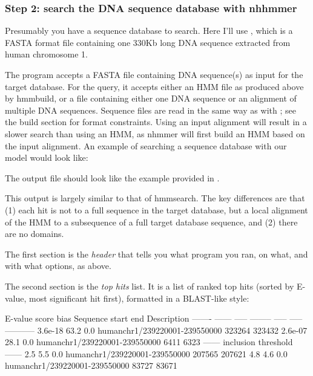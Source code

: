 \subsubsection{Step 2: search the DNA sequence database with nhhmmer}

Presumably you have a sequence database to search. Here I'll use
, which is a FASTA format
file containing one 330Kb long DNA sequence extracted from human chromosome 1.

The program  accepts a FASTA file containing DNA sequence(s) as
input for the target database. For the query, it accepts either an HMM file as
produced above by hmmbuild, or a file containing either one DNA sequence or an
alignment of multiple DNA sequences. Sequence files are read in the same way as
with ; see the build section for format constraints. Using an
input alignment will result in a slower search than using an HMM, as nhmmer will
first build an HMM based on the input alignment. An example of searching a
sequence database with our  model would look like:


The output file  should look like the example provided in
.

This output is largely similar to that of hmmsearch. The key differences are
that (1) each hit is not to a full sequence in the target database, but a
local alignment of the HMM to a subsequence of a full target database sequence,
and (2) there are no domains.

The first section is the \emph{header} that tells you what program you ran, on
what, and with what options, as above.

The second section is the \emph{top hits} list. It is a list
of ranked top hits (sorted by E-value, most significant hit first),
formatted in a BLAST-like style:

\begin{sreoutput}
    E-value  score  bias  Sequence                       start    end  Description
    ------- ------ -----  --------                       -----  -----  -----------
    3.6e-18   63.2   0.0  humanchr1/239220001-239550000 323264 323432
    2.6e-07   28.1   0.0  humanchr1/239220001-239550000   6411   6323
  ------ inclusion threshold ------
        2.5    5.5   0.0  humanchr1/239220001-239550000 207565 207621
        4.8    4.6   0.0  humanchr1/239220001-239550000  83727  83671
 \end{sreoutput}

